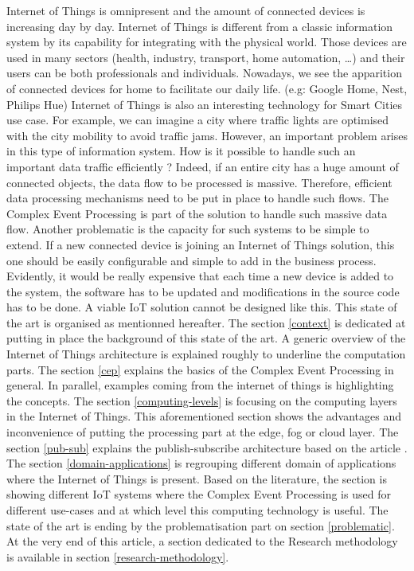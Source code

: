 \documentclass[11pt]{article}
\begin{document}
Internet of Things is omnipresent and the amount of connected devices is increasing day by day. Internet of Things is different from a classic information system by its capability for integrating with the physical world. Those devices are used in many sectors (health, industry, transport, home automation, \ldots) and their users can be both professionals and individuals. Nowadays, we see the apparition of connected devices for home to facilitate our daily life. (e.g: Google Home, Nest, Philips Hue) Internet of Things is also an interesting technology for Smart Cities use case. For example, we can imagine a city where traffic lights are optimised with the city mobility to avoid traffic jams. However, an important problem arises in this type of information system. How is it possible to handle such an important data traffic efficiently ? Indeed, if an entire city has a huge amount of connected objects, the data flow to be processed is massive. Therefore, efficient data processing mechanisms need to be put in place to handle such flows.
\newline
\newline
The Complex Event Processing is part of the solution to handle such massive data flow. Another problematic is the capacity for such systems to be simple to extend. If a new connected device is joining an Internet of Things solution, this one should be easily configurable and simple to add in the business process. Evidently, it would be really expensive that each time a new device is added to the system, the software has to be updated and modifications in the source code has to be done. A viable IoT solution cannot be designed like this. 
\newline
\newline
This state of the art is organised as mentionned hereafter. The section \ref{context} is dedicated at putting in place the background of this state of the art. A generic overview of the Internet of Things architecture is explained roughly to underline the computation parts. The section \ref{cep} explains the basics of the Complex Event Processing in general. In parallel, examples coming from the internet of things is highlighting the concepts. The section \ref{computing-levels} is focusing on the computing layers in the Internet of Things. This aforementioned section shows the advantages and inconvenience of putting the processing part at the edge, fog or cloud layer. The section \ref{pub-sub} explains the publish-subscribe architecture based on the article \cite{A-Semantic-Publish-Subscribe-Architecture}. The section \ref{domain-applications} is regrouping different domain of applications where the Internet of Things is present. Based on the literature, the section is showing different IoT systems where the Complex Event Processing is used for different use-cases and at which level this computing technology is useful. The state of the art is ending by the problematisation part on section \ref{problematic}. At the very end of this article, a section dedicated to the Research methodology is available in section \ref{research-methodology}.
\end{document}

